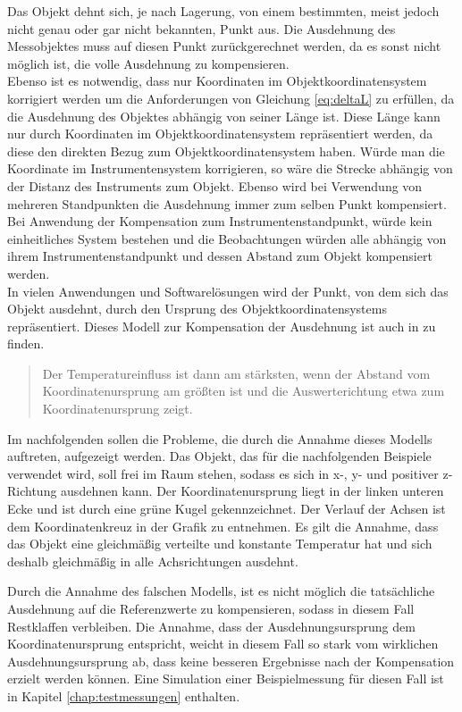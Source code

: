 Das Objekt dehnt sich, je nach Lagerung, von einem bestimmten, meist jedoch nicht genau oder gar nicht bekannten, Punkt aus. Die Ausdehnung des Messobjektes muss auf diesen Punkt zurückgerechnet werden, da es sonst nicht möglich ist, die volle Ausdehnung zu kompensieren.\\
Ebenso ist es notwendig, dass nur Koordinaten im Objektkoordinatensystem korrigiert werden um die Anforderungen von Gleichung \ref{eq:deltaL} zu erfüllen, da die Ausdehnung des Objektes abhängig von seiner Länge ist. Diese Länge kann nur durch Koordinaten im Objektkoordinatensystem repräsentiert werden, da diese den direkten Bezug zum  Objektkoordinatensystem haben. Würde man die Koordinate im Instrumentensystem korrigieren, so wäre die Strecke abhängig von der Distanz des Instruments zum Objekt. Ebenso wird bei Verwendung von mehreren Standpunkten die Ausdehnung immer zum selben Punkt kompensiert. Bei Anwendung der Kompensation zum Instrumentenstandpunkt, würde kein einheitliches System bestehen und die Beobachtungen würden alle abhängig von ihrem Instrumentenstandpunkt und dessen Abstand zum Objekt kompensiert werden.\\
In vielen Anwendungen und Softwarelösungen wird der Punkt, von dem sich das Objekt ausdehnt, durch den Ursprung des Objektkoordinatensystems repräsentiert. Dieses Modell zur Kompensation der Ausdehnung ist auch in \cite{Hernla2013} zu finden. 
\begin{quotation}
Der  Temperatureinfluss ist dann am stärksten, wenn der Abstand vom Koordinatenursprung am größten ist und die Auswerterichtung etwa zum Koordinatenursprung zeigt.
\end{quotation}
Im nachfolgenden sollen die Probleme, die durch die Annahme dieses Modells auftreten, aufgezeigt werden.
Das Objekt, das für die nachfolgenden Beispiele verwendet wird, soll frei im Raum stehen, sodass es sich in x-, y- und positiver z-Richtung ausdehnen kann. Der Koordinatenursprung liegt in der linken unteren Ecke und ist durch eine grüne Kugel gekennzeichnet. Der Verlauf der Achsen ist dem Koordinatenkreuz in der Grafik zu entnehmen. Es gilt die Annahme, dass das Objekt eine gleichmäßig verteilte und konstante Temperatur hat und sich deshalb gleichmäßig in alle Achsrichtungen ausdehnt.

Durch die Annahme des falschen Modells, ist es nicht möglich die tatsächliche Ausdehnung auf die Referenzwerte zu kompensieren, sodass in diesem Fall Restklaffen verbleiben. Die Annahme, dass der Ausdehnungsursprung dem Koordinatenursprung entspricht, weicht in diesem Fall so stark vom wirklichen Ausdehnungsursprung ab, dass keine besseren Ergebnisse nach der Kompensation erzielt werden können. Eine Simulation einer Beispielmessung für diesen Fall ist in Kapitel \ref{chap:testmessungen} enthalten.\\

